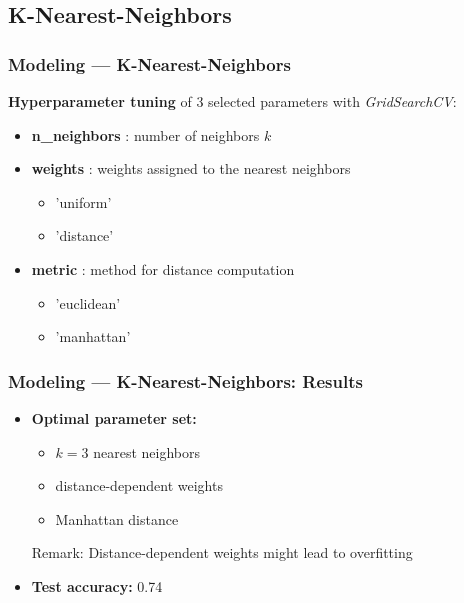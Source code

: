 \documentclass[10pt, aspectratio=169]{beamer}
\begin{document}
\subsection{K-Nearest-Neighbors}
\begin{frame}
    \frametitle{Modeling --- K-Nearest-Neighbors}
    \textbf{Hyperparameter tuning} of 3 selected parameters with \textit{GridSearchCV}:
    \begin{itemize}
        \item \textbf{n\_neighbors} : number of neighbors $k$
        \item \textbf{weights} : weights assigned to the nearest neighbors
            \begin{itemize} 
                \item 'uniform'
                \item 'distance'
            \end{itemize}
        \item \textbf{metric} : method for distance computation
            \begin{itemize}
                \item 'euclidean'
                \item 'manhattan'
            \end{itemize}
    \end{itemize}
\end{frame}
\begin{frame}
    \frametitle{Modeling --- K-Nearest-Neighbors: Results}
    \begin{itemize}
        \item \textbf{Optimal parameter set:}
            \begin{itemize}
                \item $k=3$ nearest neighbors
                \item distance-dependent weights
                \item Manhattan distance
            \end{itemize}
            Remark: Distance-dependent weights might lead to overfitting
        \item \textbf{Test accuracy:} 0.74
    \end{itemize}
\end{frame}
\end{document}
